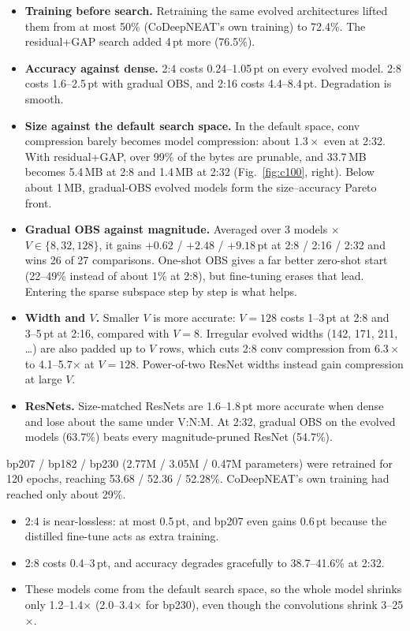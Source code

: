 \documentclass[10pt,a4paper]{article}
\makeatletter
\newcommand{\B}[1]{\textbf{#1}}
\renewcommand\subsection{\@startsection{subsection}{2}{\z@}{-1.4ex plus -.3ex}{0.5ex}{\normalfont\normalsize\bfseries}}
\makeatother
\begin{document}
\begin{itemize}
\item \B{Training before search.} Retraining the same evolved architectures lifted them from at most 50\% (CoDeepNEAT's own training) to 72.4\%. The residual+GAP search added 4\,pt more (76.5\%).
\item \B{Accuracy against dense.} 2:4 costs 0.24--1.05\,pt on every evolved model. 2:8 costs 1.6--2.5\,pt with gradual OBS, and 2:16 costs 4.4--8.4\,pt. Degradation is smooth.
\item \B{Size against the default search space.} In the default space, conv compression barely becomes model compression: about $1.3\times$ even at 2:32. With residual+GAP, over 99\% of the bytes are prunable, and 33.7\,MB becomes 5.4\,MB at 2:8 and 1.4\,MB at 2:32 (Fig.~\ref{fig:c100}, right). Below about 1\,MB, gradual-OBS evolved models form the size--accuracy Pareto front.
\item \B{Gradual OBS against magnitude.} Averaged over 3 models $\times$ $V\in\{8,32,128\}$, it gains $+0.62$ / $+2.48$ / $\mathbf{+9.18}$\,pt at 2:8 / 2:16 / 2:32 and wins 26 of 27 comparisons. One-shot OBS gives a far better zero-shot start (22--49\% instead of about 1\% at 2:8), but fine-tuning erases that lead. Entering the sparse subspace step by step is what helps.
\item \B{Width and $V$.} Smaller $V$ is more accurate: $V{=}128$ costs 1--3\,pt at 2:8 and 3--5\,pt at 2:16, compared with $V{=}8$. Irregular evolved widths (142, 171, 211, \dots) are also padded up to $V$ rows, which cuts 2:8 conv compression from $6.3\times$ to 4.1--5.7$\times$ at $V{=}128$. Power-of-two ResNet widths instead gain compression at large $V$.
\item \B{ResNets.} Size-matched ResNets are 1.6--1.8\,pt more accurate when dense and lose about the same under V:N:M. At 2:32, gradual OBS on the evolved models (63.7\%) beats every magnitude-pruned ResNet (54.7\%).
\end{itemize}

\subsection{ImageNet-100}
bp207 / bp182 / bp230 (2.77M / 3.05M / 0.47M parameters) were retrained for 120 epochs, reaching 53.68 / 52.36 / 52.28\%. CoDeepNEAT's own training had reached only about 29\%.
\begin{itemize}
\item 2:4 is near-lossless: at most 0.5\,pt, and bp207 even gains 0.6\,pt because the distilled fine-tune acts as extra training.
\item 2:8 costs 0.4--3\,pt, and accuracy degrades gracefully to 38.7--41.6\% at 2:32.
\item These models come from the default search space, so the whole model shrinks only 1.2--1.4$\times$ (2.0--3.4$\times$ for bp230), even though the convolutions shrink 3--25$\times$.
\end{itemize}
\end{document}
